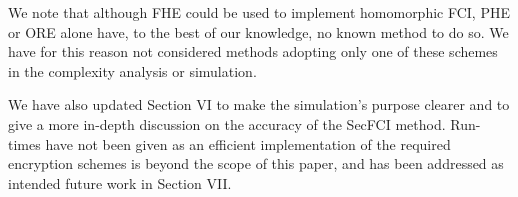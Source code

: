 \documentclass[a4paper]{scrartcl}
\newenvironment{rebuttal}{\begin{enumerate}[label={\color{grey}\thesection.\arabic{enumi}},leftmargin=0pt,ref=\thesection.\arabic{enumi}]}{\end{enumerate}}
\begin{document}
\begin{rebuttal}
We note that although FHE could be used to implement homomorphic FCI, PHE or ORE alone have, to the best of our knowledge, no known method to do so. We have for this reason not considered methods adopting only one of these schemes in the complexity analysis or simulation.


We have also updated Section VI to make the simulation's purpose clearer and to give a more in-depth discussion on the accuracy of the SecFCI method. Run-times have not been given as an efficient implementation of the required encryption schemes is beyond the scope of this paper, and has been addressed as intended future work in Section VII.


\end{rebuttal}

\end{document}

